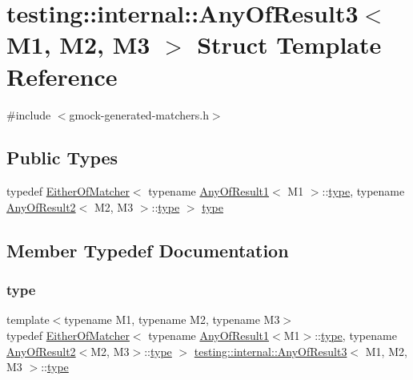 \hypertarget{structtesting_1_1internal_1_1_any_of_result3}{}\section{testing\+:\+:internal\+:\+:Any\+Of\+Result3$<$ M1, M2, M3 $>$ Struct Template Reference}
\label{structtesting_1_1internal_1_1_any_of_result3}


{\ttfamily \#include $<$gmock-\/generated-\/matchers.\+h$>$}

\subsection*{Public Types}
\begin{DoxyCompactItemize}
\item 
typedef \hyperlink{classtesting_1_1internal_1_1_either_of_matcher}{Either\+Of\+Matcher}$<$ typename \hyperlink{structtesting_1_1internal_1_1_any_of_result1}{Any\+Of\+Result1}$<$ M1 $>$\+::\hyperlink{structtesting_1_1internal_1_1_any_of_result3_a232b20553cc0a33a6741e85e19ef4b0c}{type}, typename \hyperlink{structtesting_1_1internal_1_1_any_of_result2}{Any\+Of\+Result2}$<$ M2, M3 $>$\+::\hyperlink{structtesting_1_1internal_1_1_any_of_result3_a232b20553cc0a33a6741e85e19ef4b0c}{type} $>$ \hyperlink{structtesting_1_1internal_1_1_any_of_result3_a232b20553cc0a33a6741e85e19ef4b0c}{type}
\end{DoxyCompactItemize}


\subsection{Member Typedef Documentation}
\mbox{\label{structtesting_1_1internal_1_1_any_of_result3_a232b20553cc0a33a6741e85e19ef4b0c}} 
\subsubsection{\texorpdfstring{type}{type}}
{\footnotesize\ttfamily template$<$typename M1, typename M2, typename M3$>$ \\
typedef \hyperlink{classtesting_1_1internal_1_1_either_of_matcher}{Either\+Of\+Matcher}$<$ typename \hyperlink{structtesting_1_1internal_1_1_any_of_result1}{Any\+Of\+Result1}$<$M1$>$\+::\hyperlink{structtesting_1_1internal_1_1_any_of_result3_a232b20553cc0a33a6741e85e19ef4b0c}{type}, typename \hyperlink{structtesting_1_1internal_1_1_any_of_result2}{Any\+Of\+Result2}$<$M2, M3$>$\+::\hyperlink{structtesting_1_1internal_1_1_any_of_result3_a232b20553cc0a33a6741e85e19ef4b0c}{type} $>$ \hyperlink{structtesting_1_1internal_1_1_any_of_result3}{testing\+::internal\+::\+Any\+Of\+Result3}$<$ M1, M2, M3 $>$\+::\hyperlink{structtesting_1_1internal_1_1_any_of_result3_a232b20553cc0a33a6741e85e19ef4b0c}{type}}



